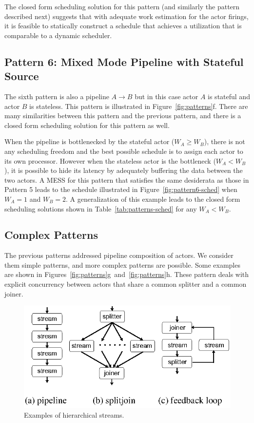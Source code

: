 The closed form scheduling solution for this pattern (and similarly
the pattern described next) suggests that with adequate work
estimation for the actor firings, it is feasible to statically
construct a schedule that achieves a utilization that is comparable to
a dynamic scheduler.

\subsection{Pattern 6: Mixed Mode Pipeline with Stateful Source}

The sixth pattern is also a pipeline $A\rightarrow B$ but in this case
actor $A$ is stateful and actor $B$ is stateless. This pattern is
illustrated in Figure~\ref{fig:patterns}f. There are many similarities
between this pattern and the previous pattern, and there is a closed
form scheduling solution for this pattern as well. 

When the pipeline is bottlenecked by the stateful actor ($W_A \ge
W_B$), there is not any scheduling freedom and the best possible
schedule is to assign each actor to its own processor. However when
the stateless actor is the bottleneck ($W_A < W_B$), it is possible to
hide its latency by adequately buffering the data between the two
actors. A MESS for this pattern that satisfies the same desiderata as
those in Pattern 5 leads to the schedule illustrated in
Figure~\ref{fig:pattern6-sched} when $W_A = 1$ and $W_B = 2$.  A
generalization of this example leads to the closed form scheduling
solutions shown in Table~\ref{tab:patterns-sched} for any $W_A < W_B$.


\subsection{Complex Patterns}

The previous patterns addressed pipeline composition of actors. We
consider them simple patterns, and more complex patterns are
possible. Some examples are shown in
Figures~\ref{fig:patterns}g~and~\ref{fig:patterns}h. These pattern deals
with explicit concurrency between actors that share a common splitter
and a common joiner.

\begin{figure}[t]
\begin{center}
 \includegraphics[scale=1, angle=0]{./constructs-eg.eps}
 \caption{Examples of hierarchical streams.}
 \label{fig:containers}
\end{center}
\end{figure}


